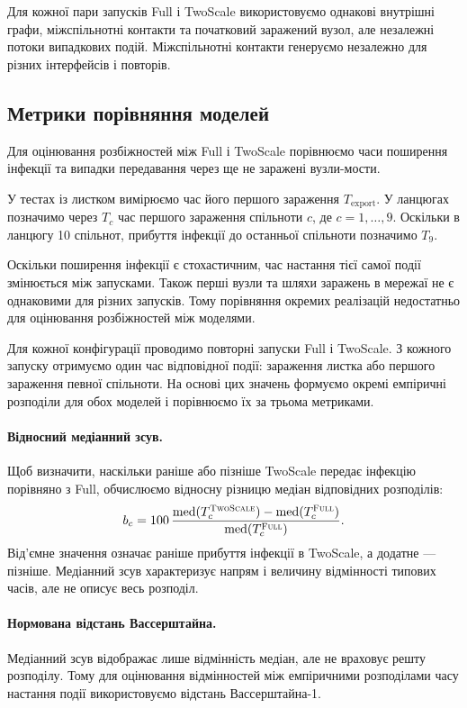 \documentclass[a4paper,fleqn]{cas-sc}
\newcommand{\Full}{\textup{\textsc{Full}}}
\newcommand{\TS}{\textup{\textsc{TwoScale}}}
\begin{document}
Для кожної пари запусків Full і TwoScale
використовуємо однакові внутрішні графи,
міжспільнотні контакти та початковий
заражений вузол, але незалежні потоки
випадкових подій. Міжспільнотні контакти
генеруємо незалежно для різних інтерфейсів
і повторів.





\subsection{Метрики порівняння моделей}

Для оцінювання розбіжностей між Full і TwoScale
порівнюємо часи поширення інфекції та випадки
передавання через ще не заражені вузли-мости.

У тестах із листком вимірюємо час його першого
зараження $T_{\mathrm{export}}$.
У ланцюгах позначимо через $T_c$ час першого
зараження спільноти $c$, де $c=1,\ldots,9$.
Оскільки в ланцюгу 10 спільнот, прибуття інфекції до останньої спільноти
позначимо $T_9$.

Оскільки поширення інфекції є стохастичним,
час настання тієї самої події змінюється
між запусками.  Також перші вузли та шляхи заражень в мережаї не є однаковими для різних запусків. Тому порівняння окремих
реалізацій недостатньо для оцінювання
розбіжностей між моделями.

Для кожної конфігурації проводимо повторні
запуски Full і TwoScale. З кожного запуску
отримуємо один час відповідної події:
зараження листка або першого зараження
певної спільноти. На основі цих значень
формуємо окремі емпіричні розподіли
для обох моделей і порівнюємо їх
за трьома метриками.



\paragraph{Відносний медіанний зсув.}
Щоб визначити, наскільки раніше або пізніше
TwoScale передає інфекцію порівняно з Full,
обчислюємо відносну різницю медіан
відповідних розподілів:
\[
b_c =
100\,
\frac{
\operatorname{med}(T_c^{\TS})-
\operatorname{med}(T_c^{\Full})
}{
\operatorname{med}(T_c^{\Full})
}.
\]
Від'ємне значення означає раніше прибуття
інфекції в TwoScale, а додатне --- пізніше.
Медіанний зсув характеризує напрям
і величину відмінності типових часів,
але не описує весь розподіл.

\paragraph{Нормована відстань Вассерштайна.}
Медіанний зсув відображає лише відмінність
медіан, але не враховує решту розподілу.
Тому для оцінювання відмінностей між
емпіричними розподілами часу настання
події використовуємо відстань
Вассерштайна-1.
\end{document}
